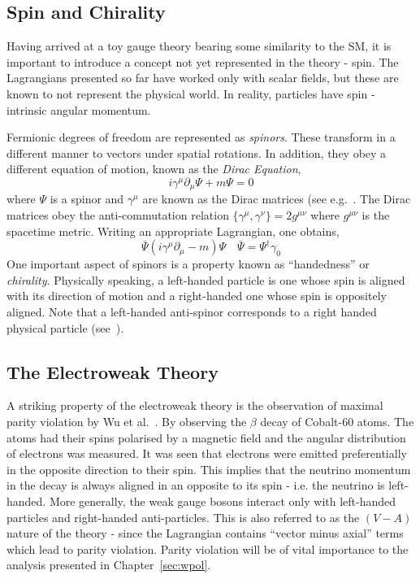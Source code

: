 \subsection{Spin and Chirality}
Having arrived at a toy gauge theory bearing some similarity to the \ac{SM}, it
is important to introduce a concept not yet represented in the theory -
spin. The Lagrangians presented so far have worked only with scalar fields, but
these are known to not represent the physical world. In reality, particles have
spin - intrinsic angular momentum.

Fermionic degrees of freedom are represented as \emph{spinors}. These transform
in a different manner to vectors under spatial rotations. In addition, they obey
a different equation of motion, known as the \emph{Dirac Equation},
\begin{equation}
i\gamma^\mu \partial_{\mu}\Psi + m\Psi = 0
\end{equation}
where $\Psi$ is a spinor and $\gamma^{\mu}$ are known as the Dirac matrices
(see e.g.~\cite{aitchison}. The Dirac matrices obey the anti-commutation
relation $\{\gamma^{\mu}, \gamma^{\nu}\} = 2g^{\mu\nu}$ where $g^{\mu\nu}$ is
the spacetime metric. Writing an appropriate Lagrangian, one obtains,
\begin{equation}
\bar{\Psi} \left (i\gamma^{\mu}\partial_{\mu} -m\right)\Psi \quad \bar{\Psi} =
\Psi^{\dagger}\gamma_0
\end{equation}
One important aspect of spinors is a property known as ``handedness'' or
\emph{chirality}. Physically speaking, a left-handed particle is one whose spin
is aligned with its direction of motion and a right-handed one whose spin is
oppositely aligned. Note that a left-handed anti-spinor corresponds to a right
handed physical particle (see~\cite{peskin_schroeder}).

\subsection{The Electroweak Theory}
A striking property of the electroweak theory is the observation of maximal
parity violation by Wu et al.~\cite{wu_parity}. By observing the $\beta$ decay of
Cobalt-60 atoms. The atoms had their spins polarised by a magnetic field and the
angular distribution of electrons was measured. It was seen that electrons were
emitted preferentially in the opposite direction to their spin. This implies
that the neutrino momentum in the decay is always aligned in an opposite to its
spin - i.e. the neutrino is left-handed. More generally, the weak gauge bosons
interact only with left-handed particles and right-handed anti-particles. This
is also referred to as the $(V-A)$ nature of the theory - since the Lagrangian
contains ``vector minus axial'' terms which lead to parity violation. Parity
violation will be of vital importance to the analysis presented in
Chapter~\ref{sec:wpol}.

